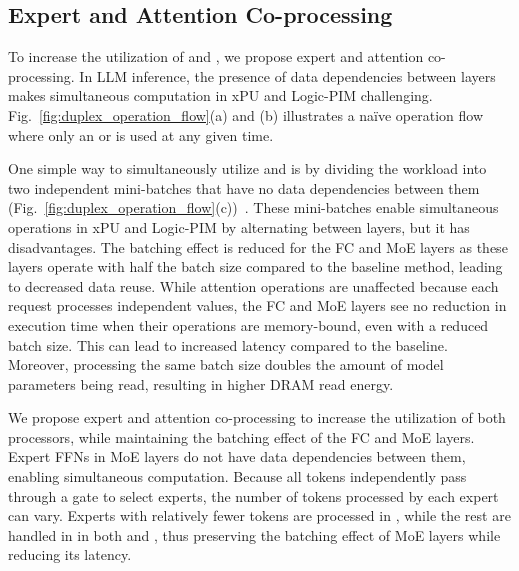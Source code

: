\subsection{Expert and Attention Co-processing}
\label{sec:duplex_co-processing}
To increase the utilization of \highp and \lowp, we propose expert and attention co-processing.
In LLM inference, the presence of data dependencies between layers makes simultaneous computation in xPU and Logic-PIM challenging. 
Fig.~\ref{fig:duplex_operation_flow}(a) and (b) illustrates a na\"ive operation flow where only an \highp or \lowp is used at any given time. 


One simple way to simultaneously utilize \highp and \lowp is by dividing the workload into two independent mini-batches that have no data dependencies between them (Fig.~\ref{fig:duplex_operation_flow}(c))~\cite{asplos-2024-neupim}. 
These mini-batches enable simultaneous operations in xPU and Logic-PIM by alternating between layers, but it has disadvantages. 
The batching effect is reduced for the FC and MoE layers as these layers operate with half the batch size compared to the baseline method, leading to decreased data reuse. 
While attention operations are unaffected because each request processes independent values, the FC and MoE layers see no reduction in execution time when their operations are memory-bound, even with a reduced batch size. 
This can lead to increased latency compared to the baseline. 
Moreover, processing the same batch size doubles the amount of model parameters being read, resulting in higher DRAM read energy.



We propose expert and attention co-processing to increase the utilization of both processors, while maintaining the batching effect of the FC and MoE layers.
Expert FFNs in MoE layers do not have data dependencies between them, enabling simultaneous computation.
Because all tokens independently pass through a gate to select experts, the number of tokens processed by each expert can vary.
Experts with relatively fewer tokens are processed in \lowp, while the rest are handled in \highp in both \deconlystage and \mixedstage, thus preserving the batching effect of MoE layers while reducing its latency.



